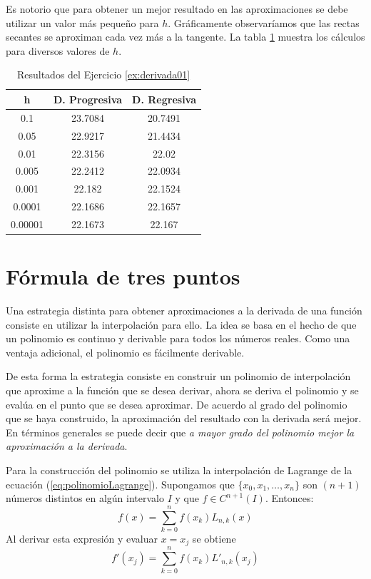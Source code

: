 \begin{exerciseT}
{Es notorio que para obtener un mejor resultado en las aproximaciones se debe utilizar un valor más pequeño para $h$.
Gráficamente observaríamos que las rectas secantes se aproximan cada vez más a la tangente. La tabla \ref{table:derivada01} 
muestra los cálculos para diversos valores de $h$.

\begin{table}[H]
	\centering
	\begin{tabular}{ccc}
		\toprule
		h & D. Progresiva & D. Regresiva \\
		\midrule
		0.1 & 23.7084 & 20.7491 \\
		0.05 & 22.9217 & 21.4434 \\
		0.01 & 22.3156 & 22.02 \\
		0.005 & 22.2412 & 22.0934 \\
		0.001 & 22.182 & 22.1524 \\
		0.0001 & 22.1686 & 22.1657 \\
		0.00001 & 22.1673 & 22.167\\
		\bottomrule
	\end{tabular}
	\label{table:derivada01}
	\caption{Resultados del Ejercicio \ref{ex:derivada01}}
\end{table}
\label{ex:derivada01}
}\end{exerciseT}

\section{Fórmula de tres puntos}
\label{section:d3p}
Una estrategia distinta para obtener aproximaciones a la derivada de una función consiste en utilizar la interpolación para ello.
La idea se basa en el hecho de que un polinomio es continuo y derivable para todos los números reales. Como una ventaja adicional, 
el polinomio es fácilmente derivable. 

De esta forma la estrategia consiste en construir un polinomio de interpolación que aproxime 
a la función que se desea derivar, ahora se deriva el polinomio y se evalúa en el punto que se desea aproximar. De acuerdo al grado
del polinomio que se haya construido, la aproximación del resultado con la derivada será mejor. En términos generales se puede decir
que \textit{a mayor grado del polinomio mejor la aproximación a la derivada}.

Para la construcción del polinomio se utiliza la interpolación de Lagrange de la ecuación (\ref{eq:polinomioLagrange}). Supongamos 
que $\{x_0,x_1,\dots,x_n\}$ son $(n+1)$ números distintos en algún intervalo $I$ y que $f\in C^{n+1}(I)$. Entonces:
\[ f(x) = \sum_{k=0}^n f(x_k)L_{n,k}(x) \]
Al derivar esta expresión y evaluar $x=x_j$ se obtiene
\begin{equation}
	f'(x_j) = \sum_{k=0}^n f(x_k)L'_{n,k}(x_j)
	\label{eq:formula(n+1)Puntos} 
\end{equation}

